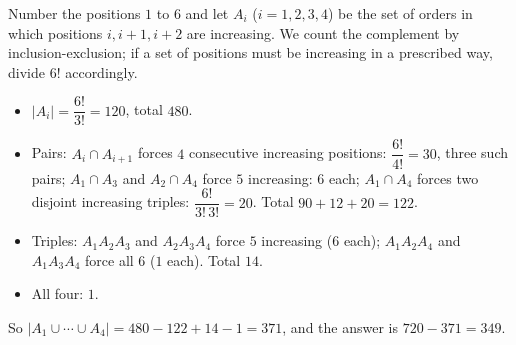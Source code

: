 Number the positions $1$ to $6$ and let $A_i$ ($i=1,2,3,4$) be the set of orders in which positions $i,i+1,i+2$ are increasing. We count the complement by inclusion-exclusion; if a set of positions must be increasing in a prescribed way, divide $6!$ accordingly.
\begin{itemize}
\item $|A_i|=\dfrac{6!}{3!}=120$, total $480$.
\item Pairs: $A_i\cap A_{i+1}$ forces $4$ consecutive increasing positions: $\dfrac{6!}{4!}=30$, three such pairs; $A_1\cap A_3$ and $A_2\cap A_4$ force $5$ increasing: $6$ each; $A_1\cap A_4$ forces two disjoint increasing triples: $\dfrac{6!}{3!\,3!}=20$. Total $90+12+20=122$.
\item Triples: $A_1A_2A_3$ and $A_2A_3A_4$ force $5$ increasing ($6$ each); $A_1A_2A_4$ and $A_1A_3A_4$ force all $6$ ($1$ each). Total $14$.
\item All four: $1$.
\end{itemize}
So $|A_1\cup\cdots\cup A_4|=480-122+14-1=371$, and the answer is $720-371=\boxed{349}$.

